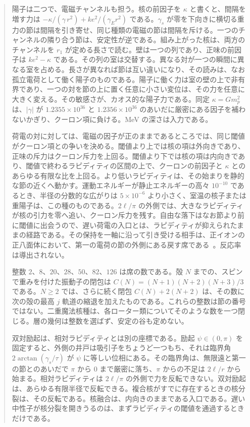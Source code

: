 \documentclass[a4paper]{article}
\begin{document}
\begin{abstract}
陽子は二つで、電磁チャンネルも担う。核の前因子を \(\kappa\) と書くと、間隔を増す力は \(-\kappa/(\gamma\,r^2)+k e^2/(\gamma_E r^2)\) である。\(\gamma_s\) が零を下向きに横切る重力の節は間隔を引き寄せ、同じ種類の電磁の節は間隔を斥ける。一つのチャンネルの隣り合う節は、安定性が逆である。組み上がった核は、両方のチャンネルを \(r_1\) が定める長さで読む。壁は一つの列であり、正味の前因子は \(ke^{2}-\kappa\) である。その列の室は交替する。異なる対が一つの瞬間に異なる室を占める。長さが異なれば節は互い違いになり、その読みは、なお孤立電荷として働く陽子のものである。陽子に働く力は室の壁の上で非有界であり、一つの対を節の上に置く任意に小さい変位は、その力を任意に大きく変える。その敏感さが、カオス的な陽子力である。同定 \(\kappa=G m_p^2\) は、\(|\gamma|\) が \(1.2355\times 10^{36}\) と \(1.2356\times 10^{36}\) のあいだに厳密にある因子を補わないかぎり、クーロン項に負ける。MeV の深さは入力である。

荷電の対に対しては、電磁の因子が正のままであるところでは、同じ閾値がクーロン項との争いを決める。閾値より上では核の項は外向きであり、正味の斥力はクーロン斥力を上回る。閾値より下では核の項は内向きであり、閾値で終わるラピディティの区間の上で、クーロンの前因子と \(\kappa\) とのあらゆる有限な比を上回る。より低いラピディティは、その始まりを静的な節の近くへ動かす。運動エネルギーが静止エネルギーの高々 \(10^{-10}\) であるとき、半径の分数的な広がりは \(5\times 10^{-6}\) より小さく、室温の核子または重陽子は、この種のものである。\(2\ell/\pi\) の外側では、大きなラピディティが核の引力を零へ追い、クーロン斥力を残す。自由な落下はなお節より前に閾値に出会うので、遅い荷電の入口とは、ラピディティが抑えられたままの経路である。その保持を一軸に沿って引き受ける相手は、正イオンの正八面体において、第一の電荷の節の外側にある戻す席である~\cite{dst-cold}。反応率は導出されない。

整数 \(2\)、\(8\)、\(20\)、\(28\)、\(50\)、\(82\)、\(126\) は席の数である。殻 \(N\) までの、スピンで重みを付けた振動子の閉包は \(C(N)=(N+1)(N+2)(N+3)/3\) である。\(N\ge 2\) では、さらに続く閉包 \(C(N)+2(N+2)\) は、その数に次の殻の最高 \(j\) 軌道の縮退を加えたものである。これらの整数は節の番号ではない。二重魔法核種は、各ローター類についてそのような数を一つ閉じる。層の幾何は整数を選ばず、安定の谷も定めない。

双対励起は、相対ラピディティとは別の座標である。励起 \(\psi\in(0,\pi)\) を固定すると、外側の井戸は吸引子をちょうど一つもち、それは臨界角 \(2\arctan(\gamma_s/\tau)\) が \(\psi\) に等しい位相にある。その臨界角は、無限遠と第一の節とのあいだで \(\pi\) から \(0\) まで厳密に落ち、\(\pi\) からの不足は \(2\ell/r\) から始まる。相対ラピディティは \(2\ell/\pi\) の外側で力を反転できない。双対励起は、あらゆる有限半径で反転できる。複合核がすでに存在するときの核分裂は、その反転である。核融合は、内向きのままである入口である。遅い中性子が核分裂を開きうるのは、まずラピディティの閾値を通過するときだけである。
\end{abstract}
\end{document}
